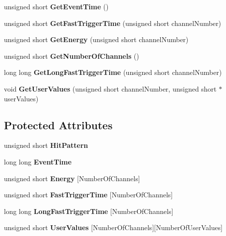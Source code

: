 \begin{DoxyCompactItemize}
unsigned short {\bfseries Get\+Event\+Time} ()
\item 
\mbox{\label{class_dgf_sub_event_af06c641fb0dabab29be0b8572aec5740}} 
unsigned short {\bfseries Get\+Fast\+Trigger\+Time} (unsigned short channel\+Number)
\item 
\mbox{\label{class_dgf_sub_event_a19e2d8959779de9f82c2e69225b9696f}} 
unsigned short {\bfseries Get\+Energy} (unsigned short channel\+Number)
\item 
\mbox{\label{class_dgf_sub_event_a48cd67e00b26bc1b707407f0b505a30c}} 
unsigned short {\bfseries Get\+Number\+Of\+Channels} ()
\item 
\mbox{\label{class_dgf_sub_event_ad1b9df7d345fd7dddbeae27fc603b7e2}} 
long long {\bfseries Get\+Long\+Fast\+Trigger\+Time} (unsigned short channel\+Number)
\item 
\mbox{\label{class_dgf_sub_event_a44c415993ed2496e6facfd29536df744}} 
void {\bfseries Get\+User\+Values} (unsigned short channel\+Number, unsigned short $\ast$user\+Values)
\end{DoxyCompactItemize}
\subsection*{Protected Attributes}
\begin{DoxyCompactItemize}
\item 
\mbox{\label{class_dgf_sub_event_af2f6acbebcc14dd9a790cf88a44a35a4}} 
unsigned short {\bfseries Hit\+Pattern}
\item 
\mbox{\label{class_dgf_sub_event_aedcb285d2a8853ac8dd0de4983a82e18}} 
long long {\bfseries Event\+Time}
\item 
\mbox{\label{class_dgf_sub_event_a73fc042eb429ad9232811351cc0059c5}} 
unsigned short {\bfseries Energy} \mbox{[}Number\+Of\+Channels\mbox{]}
\item 
\mbox{\label{class_dgf_sub_event_a55acb5f1b72f274f7201d33df90620e5}} 
unsigned short {\bfseries Fast\+Trigger\+Time} \mbox{[}Number\+Of\+Channels\mbox{]}
\item 
\mbox{\label{class_dgf_sub_event_a1a4328e7ef711bd75cd82a89b6fddad5}} 
long long {\bfseries Long\+Fast\+Trigger\+Time} \mbox{[}Number\+Of\+Channels\mbox{]}
\item 
\mbox{\label{class_dgf_sub_event_aaa57b5de7ab6aedd46a9f1486d37719c}} 
unsigned short {\bfseries User\+Values} \mbox{[}Number\+Of\+Channels\mbox{]}\mbox{[}Number\+Of\+User\+Values\mbox{]}
\end{DoxyCompactItemize}
